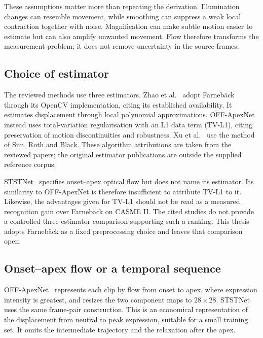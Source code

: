 These assumptions matter more than repeating the derivation. Illumination changes can resemble movement, while smoothing can suppress a weak local contraction together with noise. Magnification can make subtle motion easier to estimate but can also amplify unwanted movement. Flow therefore transforms the measurement problem; it does not remove uncertainty in the source frames.

\subsection{Choice of estimator}
\label{sec:flow-estimator}

The reviewed methods use three estimators. Zhao et al.~\cite{zhaoS2021} adopt Farneb\"ack through its OpenCV implementation, citing its established availability. It estimates displacement through local polynomial approximations. OFF-ApexNet~\cite{liong2019a} instead uses total-variation regularisation with an L1 data term (TV-L1), citing preservation of motion discontinuities and robustness. Xu et al.~\cite{xu2017} use the method of Sun, Roth and Black. These algorithm attributions are taken from the reviewed papers; the original estimator publications are outside the supplied reference corpus.

STSTNet~\cite{liong2019b} specifies onset--apex optical flow but does not name its estimator. Its similarity to OFF-ApexNet is therefore insufficient to attribute TV-L1 to it. Likewise, the advantages given for TV-L1 should not be read as a measured recognition gain over Farneb\"ack on CASME II. The cited studies do not provide a controlled three-estimator comparison supporting such a ranking. This thesis adopts Farneb\"ack as a fixed preprocessing choice and leaves that comparison open.

\subsection{Onset--apex flow or a temporal sequence}
\label{sec:flow-what-between}

OFF-ApexNet~\cite{liong2019a} represents each clip by flow from onset to apex, where expression intensity is greatest, and resizes the two component maps to $28\times28$. STSTNet~\cite{liong2019b} uses the same frame-pair construction. This is an economical representation of the displacement from neutral to peak expression, suitable for a small training set. It omits the intermediate trajectory and the relaxation after the apex.

